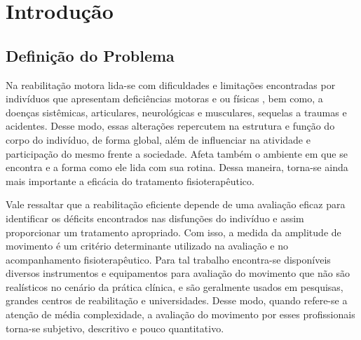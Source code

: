 \chapter*[Introdução]{Introdução}

\section{Definição do Problema}
\label{Sec:DefinicaoProblema}

  Na reabilitação motora lida-se com dificuldades e limitações encontradas por
indivíduos que apresentam deficiências motoras e ou físicas , bem como,
 a doenças sistêmicas, articulares, neurológicas e musculares, sequelas a
traumas e acidentes.  Desse modo, essas alterações repercutem
 na estrutura e função do corpo do indivíduo, de forma global, além de
influenciar na atividade e participação do mesmo frente a sociedade. Afeta
também o ambiente em que se encontra e a forma como ele lida com sua rotina.
Dessa maneira, torna-se ainda mais importante a eficácia do tratamento
fisioterapêutico.

  Vale ressaltar que  a reabilitação eficiente depende de uma avaliação eficaz
 para identificar os déficits encontrados nas disfunções do indivíduo e assim
proporcionar um tratamento apropriado. Com isso, a medida da amplitude de
movimento é  um critério determinante utilizado na avaliação e no
acompanhamento fisioterapêutico. Para tal trabalho encontra-se disponíveis
diversos instrumentos e equipamentos para avaliação do movimento que
não são realísticos no cenário da prática clínica, e são geralmente usados em
pesquisas, grandes centros de reabilitação e universidades.
  Desse modo, quando refere-se a atenção de média complexidade, a avaliação do movimento por
esses profissionais torna-se subjetivo, descritivo e pouco
quantitativo.

